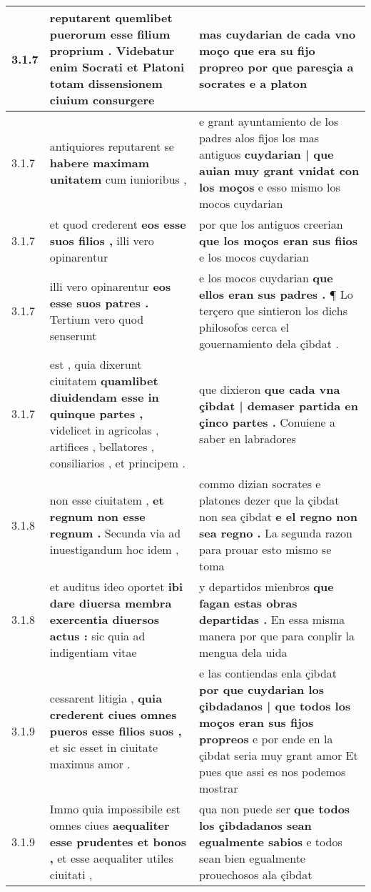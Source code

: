 \begin{tabular}{|p{1cm}|p{6.5cm}|p{6.5cm}|}
3.1.7 & reputarent \textbf{ quemlibet puerorum esse filium proprium . } Videbatur enim Socrati et Platoni totam dissensionem ciuium consurgere & mas cuydarian de cada vno moço \textbf{ que era su fijo propreo } por que paresçia a socrates e a platon \\\hline
3.1.7 & antiquiores reputarent se \textbf{ habere maximam unitatem } cum iunioribus , & e grant ayuntamiento de los padres alos fijos los mas antiguos \textbf{ cuydarian | que auian muy grant vnidat con los moços } e esso mismo los mocos cuydarian \\\hline
3.1.7 & et quod crederent \textbf{ eos esse suos filios , } illi vero opinarentur & por que los antiguos creerian \textbf{ que los moços eran sus fiios } e los mocos cuydarian \\\hline
3.1.7 & illi vero opinarentur \textbf{ eos esse suos patres . } Tertium vero quod senserunt & e los mocos cuydarian \textbf{ que ellos eran sus padres . } ¶ Lo terçero que sintieron los dichs philosofos cerca el gouernamiento dela çibdat . \\\hline
3.1.7 & est , quia dixerunt ciuitatem \textbf{ quamlibet diuidendam esse in quinque partes , } videlicet in agricolas , artifices , bellatores , consiliarios , et principem . & que dixieron \textbf{ que cada vna çibdat | demaser partida en çinco partes . } Conuiene a saber en labradores \\\hline
3.1.8 & non esse ciuitatem , \textbf{ et regnum non esse regnum . } Secunda via ad inuestigandum hoc idem , & commo dizian socrates e platones dezer que la çibdat non sea çibdat \textbf{ e el regno non sea regno . } La segunda razon para prouar esto mismo se toma \\\hline
3.1.8 & et auditus ideo oportet \textbf{ ibi dare diuersa membra exercentia diuersos actus : } sic quia ad indigentiam vitae & y departidos mienbros \textbf{ que fagan estas obras departidas . } En essa misma manera por que para conplir la mengua dela uida \\\hline
3.1.9 & cessarent litigia , \textbf{ quia crederent ciues omnes pueros esse filios suos , } et sic esset in ciuitate maximus amor . & e las contiendas enla çibdat \textbf{ por que cuydarian los çibdadanos | que todos los moços eran sus fijos propreos } e por ende en la çibdat seria muy grant amor Et pues que assi es nos podemos mostrar \\\hline
3.1.9 & Immo quia impossibile est omnes ciues \textbf{ aequaliter esse prudentes et bonos , } et esse aequaliter utiles ciuitati , & qua non puede ser \textbf{ que todos los çibdadanos sean egualmente sabios } e todos sean bien egualmente prouechosos ala çibdat \\\hline

\end{tabular}

